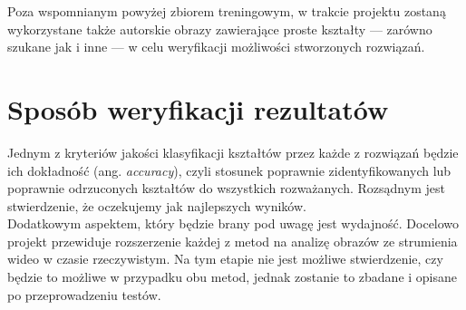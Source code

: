 \documentclass[11pt,a4paper]{article}
\begin{document}
Poza wspomnianym powyżej zbiorem treningowym, w trakcie projektu zostaną wykorzystane także autorskie obrazy zawierające proste kształty --- zarówno szukane jak i inne --- w celu weryfikacji możliwości stworzonych rozwiązań.

\section{Sposób weryfikacji rezultatów} %

Jednym z kryteriów jakości klasyfikacji kształtów przez każde z rozwiązań będzie ich dokładność (ang. \emph{accuracy}), czyli stosunek poprawnie zidentyfikowanych lub poprawnie odrzuconych kształtów do wszystkich rozważanych. Rozsądnym jest stwierdzenie, że oczekujemy jak najlepszych wyników.\\

Dodatkowym aspektem, który będzie brany pod uwagę jest wydajność. Docelowo projekt przewiduje rozszerzenie każdej z metod na analizę obrazów ze strumienia wideo w czasie rzeczywistym. Na tym etapie nie jest możliwe stwierdzenie, czy będzie to możliwe w przypadku obu metod, jednak zostanie to zbadane i opisane po przeprowadzeniu testów.
\end{document}
